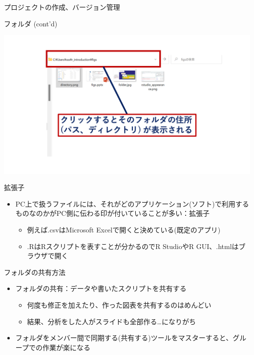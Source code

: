 \documentclass[
  ignorenonframetext,
]{beamer}
\providecommand{\tightlist}{%
  \setlength{\itemsep}{0pt}\setlength{\parskip}{0pt}}
\begin{document}
\begin{frame}{プロジェクトの作成、バージョン管理}
\begin{block}{フォルダ (cont'd)}
\protect\hypertarget{ux30d5ux30a9ux30ebux30c0-contd}{}
\begin{center}\includegraphics[width=0.95\linewidth]{figs/directory_system2} \end{center}
\end{block}

\begin{block}{拡張子}
\protect\hypertarget{ux62e1ux5f35ux5b50}{}
\begin{itemize}
\tightlist
\item
  PC上で扱うファイルには、それがどのアプリケーション(ソフト)で利用するものなのかがPC側に伝わる印が付いていることが多い：拡張子

  \begin{itemize}
  \tightlist
  \item
    例えば.csvはMicrosoft Excelで開くと決めている(既定のアプリ)
  \item
    .RはRスクリプトを表すことが分かるのでR StudioやR
    GUI、.htmlはブラウザで開く
  \end{itemize}
\end{itemize}
\end{block}

\begin{block}{フォルダの共有方法}
\protect\hypertarget{ux30d5ux30a9ux30ebux30c0ux306eux5171ux6709ux65b9ux6cd5}{}
\begin{itemize}
\tightlist
\item
  フォルダの共有：データや書いたスクリプトを共有する

  \begin{itemize}
  \tightlist
  \item
    何度も修正を加えたり、作った図表を共有するのはめんどい
  \item
    結果、分析をした人がスライドも全部作る\ldots になりがち
  \end{itemize}
\item
  フォルダをメンバー間で同期する(共有する)ツールをマスターすると、グループでの作業が楽になる


\end{itemize}
\end{block}
\end{frame}
\end{document}
